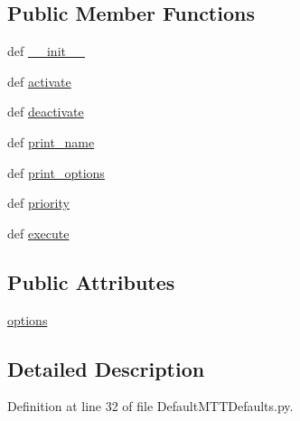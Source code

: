 \subsection*{Public Member Functions}
\begin{DoxyCompactItemize}
\item 
def \hyperlink{class_default_m_t_t_defaults_1_1_default_m_t_t_defaults_af45ae89ffdda25b5db56cc32d6f38617}{\-\_\-\-\_\-init\-\_\-\-\_\-}
\item 
def \hyperlink{class_default_m_t_t_defaults_1_1_default_m_t_t_defaults_ab168e4b76bd07ff868f6d8c8dcfbabcd}{activate}
\item 
def \hyperlink{class_default_m_t_t_defaults_1_1_default_m_t_t_defaults_abbdeb62905e733e0145243e238991e1b}{deactivate}
\item 
def \hyperlink{class_default_m_t_t_defaults_1_1_default_m_t_t_defaults_a39fc17ab14b57f8aeaa7df1a6b32f059}{print\-\_\-name}
\item 
def \hyperlink{class_default_m_t_t_defaults_1_1_default_m_t_t_defaults_aedf1031336bf735bb00dcc8d80a0bd4a}{print\-\_\-options}
\item 
def \hyperlink{class_default_m_t_t_defaults_1_1_default_m_t_t_defaults_a22c85638c99e8a0dcb01d31c326bfc55}{priority}
\item 
def \hyperlink{class_default_m_t_t_defaults_1_1_default_m_t_t_defaults_a2ccbda4994ea610724763268ab05181e}{execute}
\end{DoxyCompactItemize}
\subsection*{Public Attributes}
\begin{DoxyCompactItemize}
\item 
\hyperlink{class_default_m_t_t_defaults_1_1_default_m_t_t_defaults_a733e1af4da36392ce6126d79c61aba0b}{options}
\end{DoxyCompactItemize}


\subsection{Detailed Description}


Definition at line 32 of file Default\-M\-T\-T\-Defaults.\-py.



